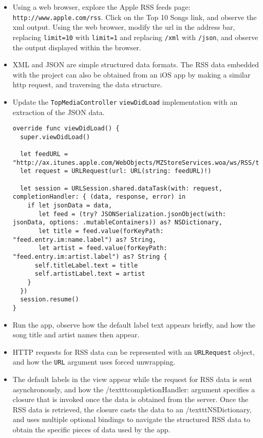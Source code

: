 \documentclass[a4paper,11pt]{scrartcl}
\begin{document}
\begin{itemize}
\item Using a web browser, explore the Apple RSS feeds page: \texttt{http://www.apple.com/rss}. Click on the Top 10 Songs link, and observe the xml output. Using the web browser, modify the url in the address bar, replacing \texttt{limit=10} with \texttt{limit=1} and replacing \texttt{/xml} with \texttt{/json}, and observe the output displayed within the browser.
\item XML and JSON are simple structured data formats. The RSS data embedded with the project can also be obtained from an iOS app by making a similar http request, and traversing the data structure.
\item Update the \texttt{TopMediaController} \texttt{viewDidLoad} implementation with an extraction of the JSON data.
\begin{lstlisting}
override func viewDidLoad() {
  super.viewDidLoad()
    
  let feedURL = "http://ax.itunes.apple.com/WebObjects/MZStoreServices.woa/ws/RSS/topsongs/limit=1/json"
  let request = URLRequest(url: URL(string: feedURL)!)
    
  let session = URLSession.shared.dataTask(with: request, completionHandler: { (data, response, error) in
    if let jsonData = data,
       let feed = (try? JSONSerialization.jsonObject(with: jsonData, options: .mutableContainers)) as? NSDictionary,
       let title = feed.value(forKeyPath: "feed.entry.im:name.label") as? String,
       let artist = feed.value(forKeyPath: "feed.entry.im:artist.label") as? String {
      self.titleLabel.text = title
      self.artistLabel.text = artist
    }
  })
  session.resume()
}
\end{lstlisting}
\item Run the app, observe how the default label text appears briefly, and how the song title and artist names then appear. 
\item HTTP requests for RSS data can be represented with an \texttt{URLRequest} object, and how the \texttt{URL} argument uses forced unwrapping.
\item The default labels in the view appear while the request for RSS data is sent asynchronously, and how the /texttt{completionHandler:} argument specifies a closure that is invoked once the data is obtained from the server. Once the RSS data is retrieved, the closure casts the data to an /texttt{NSDictionary}, and uses multiple optional bindings to navigate the structured RSS data to obtain the specific pieces of data used by the app.
\end{itemize}
\end{document}
